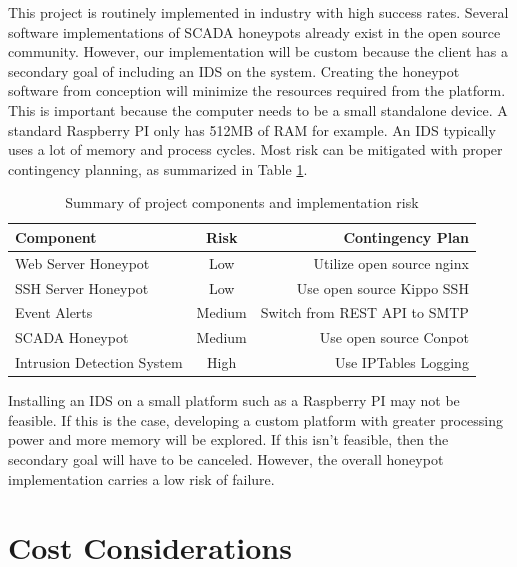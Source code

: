 This project is routinely implemented in industry with high success rates. Several software implementations of SCADA honeypots already exist in the open source community. However, our implementation will be custom because the client has a secondary goal of including an IDS on the system. Creating the honeypot software from conception will minimize the resources required from the platform. This is important because the computer needs to be a small standalone device. A standard Raspberry PI only has 512MB of RAM for example. An IDS typically uses a lot of memory and process cycles. Most risk can be mitigated with proper contingency planning, as summarized in Table \ref{table:risk}.


\vspace{0.5cm}
\begin{table}[h]
\centering
\begin{tabular}{l  c  r}
Component & Risk & Contingency Plan \\
\hline
Web Server Honeypot & Low & Utilize open source nginx\footnotemark \\
SSH Server Honeypot & Low & Use open source Kippo SSH\footnotemark \\
Event Alerts & Medium & Switch from REST API to SMTP \\
SCADA Honeypot & Medium & Use open source Conpot\footnotemark \\
Intrusion Detection System & High &  Use IPTables Logging \\
\end{tabular}
\caption{Summary of project components and implementation risk}
\label{table:risk}
\end{table}
\vspace{0.3cm}

\addtocounter{footnote}{-1}

\addtocounter{footnote}{1}

\addtocounter{footnote}{1}

Installing an IDS on a small platform such as a Raspberry PI may not be feasible. If this is the case, developing a custom platform with greater processing power and more memory will be explored. If this isn't feasible, then the secondary goal will have to be canceled. However, the overall honeypot implementation carries a low risk of failure.

\section{Cost Considerations}

